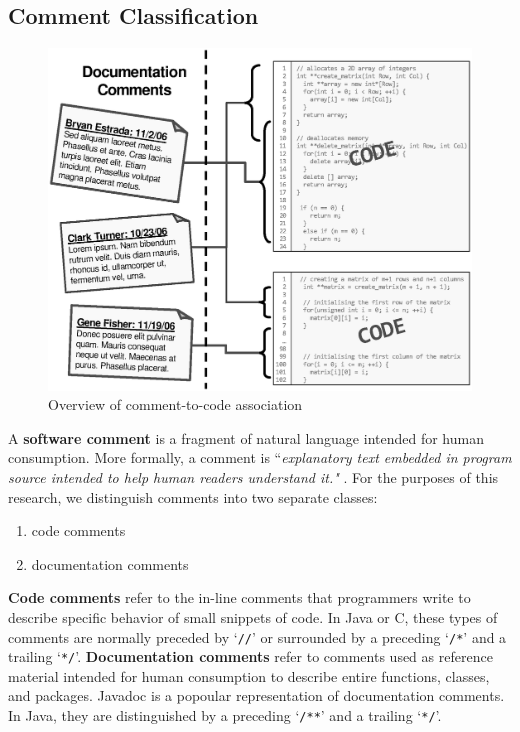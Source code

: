 \subsection{Comment Classification}

\begin{figure}
\begin{narrow}{-1.5in}{-1.5in}
\begin{center}
\includegraphics[scale=0.75]{images/comments.eps}
\end{center}
\end{narrow}
\caption{Overview of comment-to-code association}
\label{comment_to_code}
\end{figure}

A \textbf{software comment} is a fragment of natural language intended for human
consumption. More formally, a comment is ``\textit{explanatory text embedded in
program source intended to help human readers understand it."} \cite{FOLDOC}.
For the purposes of this research, we distinguish comments into two separate 
classes: 
\begin{enumerate}
  \item code comments
  \item documentation comments
\end{enumerate}

\textbf{Code comments} refer to the in-line comments that programmers write to
describe specific behavior of small snippets of code. In Java or C, these types
of comments are normally preceded by `\verb!//!' or surrounded by a preceding 
`\verb!/*!' and a trailing `\verb!*/!'. \textbf{Documentation comments} refer to
comments used as reference material intended for human consumption to describe 
entire functions, classes, and packages. Javadoc \cite{Javadoc} is a popoular
representation of documentation comments. In Java, they are distinguished by a
preceding `\verb!/**!' and a trailing `\verb!*/!'.

